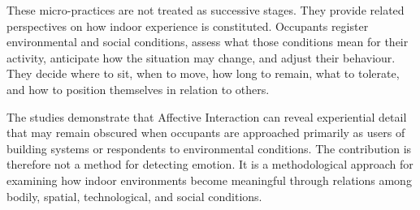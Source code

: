\begin{synopsis}
These micro-practices are not treated as successive stages. They provide related perspectives on how indoor experience is constituted. Occupants register environmental and social conditions, assess what those conditions mean for their activity, anticipate how the situation may change, and adjust their behaviour. They decide where to sit, when to move, how long to remain, what to tolerate, and how to position themselves in relation to others.

The studies demonstrate that Affective Interaction can reveal experiential detail that may remain obscured when occupants are approached primarily as users of building systems or respondents to environmental conditions. The contribution is therefore not a method for detecting emotion. It is a methodological approach for examining how indoor environments become meaningful through relations among bodily, spatial, technological, and social conditions.
\end{synopsis}




